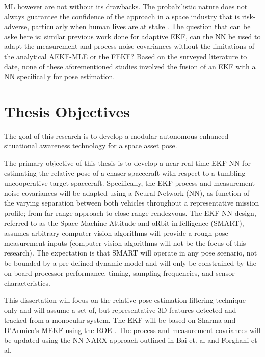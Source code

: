 ML however are not without its drawbacks. The probabilistic nature does not always guarantee the confidence of the approach in a space industry that is risk-adverse, particularly when human lives are at stake \cite{mcGovernMLSpaceLimits11, xuMLSpaceRelaibility2021107530}. The question that can be aske here is: similar previous work done for adaptive EKF, can the NN be used to adapt the measurement and process noise covariances without the limitations of the analytical AEKF-MLE or the FEKF? Based on the surveyed literature to date, none of these aforementioned studies involved the fusion of an EKF with a NN specifically for pose estimation. 
 
\section{Thesis Objectives}\label{CHAP1_4}

The goal of this research is to develop a modular autonomous enhanced situational awareness technology for a space asset pose.

The primary objective of this thesis is to develop a near real-time EKF-NN for estimating the relative pose of a chaser spacecraft with respect to a tumbling uncooperative target spacecraft. Specifically, the EKF process and measurement noise covariances will be adapted using a Neural Network (NN), as function of the varying separation between both vehicles throughout a representative mission profile; from far-range approach to close-range rendezvous. The EKF-NN design, referred to as the Space Machine Attitude and oRbit inTelligence (SMART), assumes arbitrary computer vision algorithms will provide a rough pose measurement inputs (computer vision algorithms will not be the focus of this research). The expectation is that SMART will operate in any pose scenario, not be bounded by a pre-defined dynamic model and will only be constrained by the on-board processor performance, timing, sampling frequencies, and sensor characteristics.
 
 This dissertation will focus on the relative pose estimation filtering technique only and will assume a set of, but representative 3D features detected and tracked from a monocular system. The EKF will be based on Sharma and D'Armico's MEKF using the ROE \cite{sharmePoseNonC17a}. The process and measurement covriances will be updated using the NN NARX approach outlined in Bai et. al \cite{baiKf20} and Forghani et al. \cite{ForghaniOrbitNN11}

